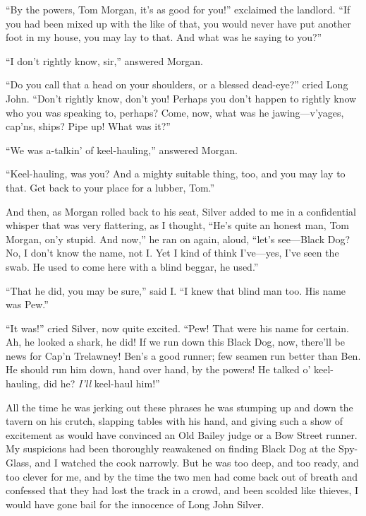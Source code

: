 \enquote{By the powers, Tom Morgan, it’s as good for you!} exclaimed the landlord. \enquote{If you had been mixed up with the like of that, you would never have put another foot in my house, you may lay to that. And what was he saying to you?}

\enquote{I don’t rightly know, sir,} answered Morgan.

\enquote{Do you call that a head on your shoulders, or a blessed dead-eye?} cried Long John. \enquote{Don’t rightly know, don’t you! Perhaps you don’t happen to rightly know who you was speaking to, perhaps? Come, now, what was he jawing---v’yages, cap’ns, ships? Pipe up! What was it?}

\enquote{We was a-talkin’ of keel-hauling,} answered Morgan.

\enquote{Keel-hauling, was you? And a mighty suitable thing, too, and you may lay to that. Get back to your place for a lubber, Tom.}

And then, as Morgan rolled back to his seat, Silver added to me in a confidential whisper that was very flattering, as I thought, \enquote{He’s quite an honest man, Tom Morgan, on’y stupid. And now,} he ran on again, aloud, \enquote{let’s see---Black Dog? No, I don’t know the name, not I. Yet I kind of think I’ve---yes, I’ve seen the swab. He used to come here with a blind beggar, he used.}

\enquote{That he did, you may be sure,} said I. \enquote{I knew that blind man too. His name was Pew.}

\enquote{It was!} cried Silver, now quite excited. \enquote{Pew! That were his name for certain. Ah, he looked a shark, he did! If we run down this Black Dog, now, there’ll be news for Cap’n Trelawney! Ben’s a good runner; few seamen run better than Ben. He should run him down, hand over hand, by the powers! He talked o’ keel-hauling, did he? \textit{I’ll} keel-haul him!}

All the time he was jerking out these phrases he was stumping up and down the tavern on his crutch, slapping tables with his hand, and giving such a show of excitement as would have convinced an Old Bailey judge or a Bow Street runner. My suspicions had been thoroughly reawakened on finding Black Dog at the Spy-Glass, and I watched the cook narrowly. But he was too deep, and too ready, and too clever for me, and by the time the two men had come back out of breath and confessed that they had lost the track in a crowd, and been scolded like thieves, I would have gone bail for the innocence of Long John Silver.

